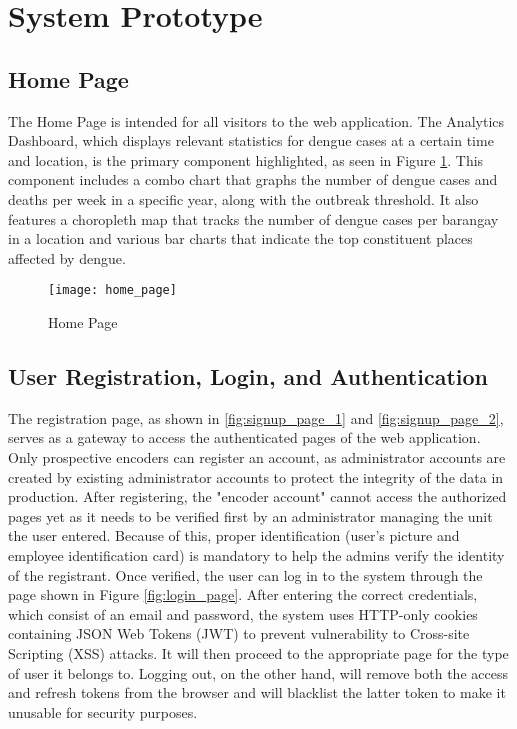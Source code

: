 \section{System Prototype}
\subsection{Home Page}
The Home Page is intended for all visitors to the web application. The Analytics Dashboard, which displays relevant statistics for dengue cases at a certain time and location, is the primary component highlighted, as seen in Figure \ref{fig:home_page}. This component includes a combo chart that graphs the number of dengue cases and deaths per week in a specific year, along with the outbreak threshold. It also features a choropleth map that tracks the number of dengue cases per barangay in a location and various bar charts that indicate the top constituent places affected by dengue. 

\begin{figure}[H]
	\centering
	\texttt{[image: home\_page]}
	\caption{Home Page}
	\label{fig:home_page}
\end{figure}

\subsection{User Registration, Login, and Authentication}
The registration page, as shown in \ref{fig:signup_page_1} and \ref{fig:signup_page_2}, serves as a gateway to access the authenticated pages of the web application. Only prospective encoders can register an account, as administrator accounts are created by existing administrator accounts to protect the integrity of the data in production. After registering, the "encoder account" cannot access the authorized pages yet as it needs to be verified first by an administrator managing the unit the user entered. Because of this, proper identification (user's picture and employee identification card) is mandatory to help the admins verify the identity of the registrant. Once verified, the user can log in to the system through the page shown in Figure \ref{fig:login_page}. After entering the correct credentials, which consist of an email and password, the system uses HTTP-only cookies containing JSON Web Tokens (JWT) to prevent vulnerability to Cross-site Scripting (XSS) attacks. It will then proceed to the appropriate page for the type of user it belongs to. Logging out, on the other hand, will remove both the access and refresh tokens from the browser and will blacklist the latter token to make it unusable for security purposes. 

